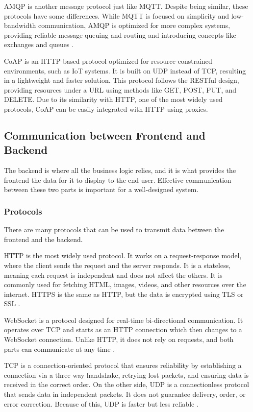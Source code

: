 \gls{AMQP} is another message protocol just like \gls{MQTT}.
Despite being similar, these protocols have some differences. While \gls{MQTT} is
focused on simplicity and low-bandwidth communication, \gls{AMQP} is optimized for
more complex systems, providing reliable message queuing and
routing and introducing concepts like exchanges and queues \cite{CommunicationProtocols}.

\gls{CoAP} is an \gls{HTTP}-based protocol optimized for resource-constrained
environments, such as \gls{IoT} systems. It is built on \gls{UDP} instead of \gls{TCP},
resulting in a lightweight and faster solution.
This protocol follows the \gls{REST}ful design, providing resources under a \gls{URL}
using methods like GET, POST, PUT, and DELETE. Due to its similarity with
\gls{HTTP}, one of the most widely used protocols, \gls{CoAP} can be easily integrated
with \gls{HTTP} using proxies\cite{coap, Jayapal2019}.

\subsection{Communication between Frontend and Backend}
The backend is where all the business logic relies, and it is what provides the frontend
the data for it to display to the end user. Effective communication between
these two parts is important for a well-designed system.
\subsubsection{Protocols}
There are many protocols that can be used to transmit data between the frontend
and the backend.

\gls{HTTP} is the most widely used protocol. It works on a
request-response model, where the client sends the request and the server
responds. It is a stateless, meaning each request is independent and does not
affect the others. It is commonly used for fetching \gls{HTML}, images, videos,
and other resources over the internet. \gls{HTTPS} is the same as \gls{HTTP}, but the
data is encrypted using \gls{TLS} or \gls{SSL} \cite{CloudflareHTTP, CloudflareHTTPS}.

WebSocket is a protocol designed for real-time bi-directional communication.
It operates over \gls{TCP} and starts as an \gls{HTTP} connection which then changes to a
WebSocket connection. Unlike \gls{HTTP}, it does not rely on requests, and both
parts can communicate at any time \cite{WebsocketRFC}.

\gls{TCP} is a connection-oriented protocol that ensures reliability by
establishing a connection via a three-way handshake, retrying lost
packets, and ensuring data is received in the correct order.
On the other side, \gls{UDP} is a connectionless protocol that sends data in
independent packets. It does not guarantee delivery, order, or error
correction. Because of this, \gls{UDP} is faster but less reliable \cite{al2018performance}.

